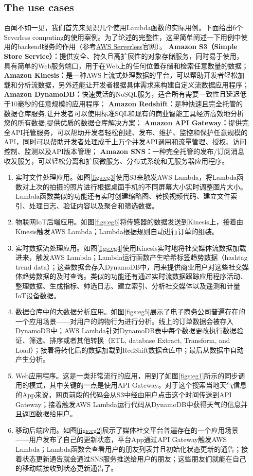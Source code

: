 \documentclass[11pt]{article}
\begin{document}
\subsection{The use cases}
百闻不如一见，我们首先来见识几个使用Lambda函数的实际用例。下面给出6个Severless computing的使用案例。为了论述的完整性，这里简单阐述一下用例中使用的backend服务的作用（参考\href{https://aws.amazon.com/serverless/}{AWS Serverless}官网）。
\textbf{Amazon S3（Simple Store Service）：}提供安全、持久且高扩展性的对象存储服务，同时易于使用，具有简单的Web服务端口，用于在Web上的任何位置存储和检索任意数量的数据；
\textbf{Amazon Kinesis：}是一种AWS上流式处理数据的平台，可以帮助开发者轻松加载和分析流数据，另外还能让开发者根据具体需求来构建自定义流数据应用程序；
\textbf{Amazon DynamoDB：}快速灵活的NoSQL服务，适合所有需要一致性且延迟低于10毫秒的任意规模的应用程序；
\textbf{Amazon Redshift：}是种快速且完全托管的数据仓库服务,让开发者可以使用标准SQL和现有的商业智能工具经济高效地分析您的所有数据,提供优质的数据仓库解决方案；
\textbf{Amazon API Gateway：}提供完全API托管服务，可以帮助开发者轻松创建、发布、维护、监控和保护任意规模的API，同时可以帮助开发者处理成千上万个并发API调用和流量管理、授权、访问控制、监测以及API版本管理；
\textbf{Amazon SNS：}一种完全托管的发布/订阅消息收发服务，可以轻松分离和扩展微服务、分布式系统和无服务器应用程序。
\begin{enumerate}
	\item 实时文件处理应用。如图\ref{figs:eg3}使用S3来触发AWS Lambda，将Lambda函数对上次的拍摄的照片进行根据桌面手机的不同屏幕大小实时调整图片大小。Lambda函数类似的功能还有实时创建缩略图、转换视频代码、建立文件索引、处理日志、验证内容以及聚合和筛选数据。
	\item 物联网IoT后端应用。如图\ref{figs:eg6}将传感器的数据发送到Kinesis上，接着由Kinesis触发AWS Lambda；Lambda根据规则自动进行订单的组装。
	\item 实时数据流处理应用。如图\ref{figs:eg4}使用Kinesis实时地将社交媒体流数据加载进来，触发AWS Lambda；Lambda运行函数产生哈希标签趋势数据（hashtag trend data）；这些数据会存入DynamoDB中，用来提供商业用户对这些社交媒体趋势数据的及时查询。类似的功能还有通过实时流数据跟踪应用程序活动、整理数据、生成指标、帅选日志、建立索引、分析社交媒体以及遥测和计量IoT设备数据。
	\item 数据仓库中的大数据分析应用。如图\ref{figs:eg5}展示了电子商务公司普遍存在的一个应用场景——对用户的购物行为进行分析。线上的订单数据会被存入DynamoDB中；AWS Lambda针对DynamoDB表中每个数据更改执行数据验证、筛选、排序或者其他转换（ETL, database Extract, Transform, and Load）；接着将转化后的数据加载到RedShift数据仓库中；最后从数据中自动产生分析。
	\item Web应用程序。这是一类非常流行的应用，用到了如图\ref{figs:eg1}所示的同步调用的模式，其中关键的一点是使用API Gateway。对于这个搜索当地天气信息的App来说，网页前段的代码会从S3中经由用户点击这个时间传送到API Gateway；接着触发AWS Lambda运行代码从DynamoDB中获得天气的信息并且返回数据给用户。
	\item 移动后端应用。如图\ref{figs:eg2}展示了媒体社交平台普遍存在的一个应用场景——用户发布了自己的更新状态，平台App通过API Gateway触发AWS Lambda；Lambda函数会查看用户的朋友列表并且初始化状态更新的通告；接着状态更新通告就会通过SNS服务推送给用户的朋友；这些朋友们就能在自己的移动端接收到状态更新通告了。
\end{enumerate}
\end{document}
